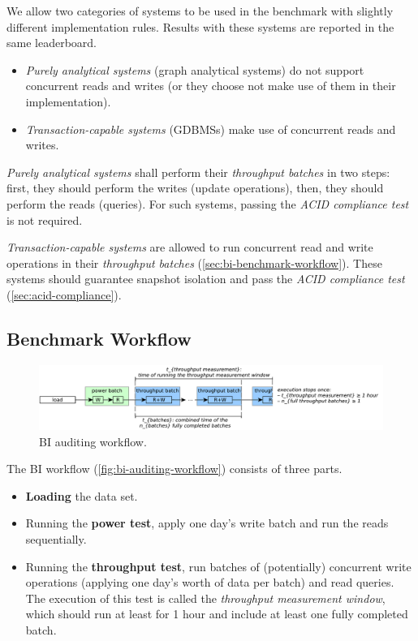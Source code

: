 We allow two categories of systems to be used in the benchmark with slightly different implementation rules.
Results with these systems are reported in the same leaderboard.

\begin{itemize}
    \item \emph{Purely analytical systems} (\eg graph analytical systems) do not support concurrent reads and writes (or they choose not make use of them in their \snbbi implementation).
    \item \emph{Transaction-capable systems} (\eg GDBMSs) make use of concurrent reads and writes.
\end{itemize}

\emph{Purely analytical systems} shall perform their \emph{throughput batches} in two steps:
first, they should perform the writes (update operations),
then, they should perform the reads (queries).
For such systems, passing the \emph{ACID compliance test} is not required.

\emph{Transaction-capable systems} are allowed to run concurrent read and write operations in their \emph{throughput batches} (\autoref{sec:bi-benchmark-workflow}).
These systems should guarantee snapshot isolation and pass the \emph{ACID compliance test} (\autoref{sec:acid-compliance}).

\subsection{Benchmark Workflow}
\label{sec:bi-benchmark-workflow}

\begin{figure}[htbp]
    \centering
    \includegraphics[scale=\yedscale]{figures/bi-auditing-workflow.pdf}
    \caption{BI auditing workflow.}
    \label{fig:bi-auditing-workflow}
\end{figure}

The BI workflow (\autoref{fig:bi-auditing-workflow}) consists of three parts.

\begin{itemize}
    \item \textbf{Loading} the data set.
    \item Running the \textbf{power test}, \ie apply one day's write batch and run the reads sequentially.
    \item Running the \textbf{throughput test}, \ie run batches of (potentially) concurrent write operations (applying one day's worth of data per batch) and read queries.
    The execution of this test is called the \emph{throughput measurement window}, which should
    run at least for 1 hour and
    include at least one fully completed batch.
\end{itemize}

